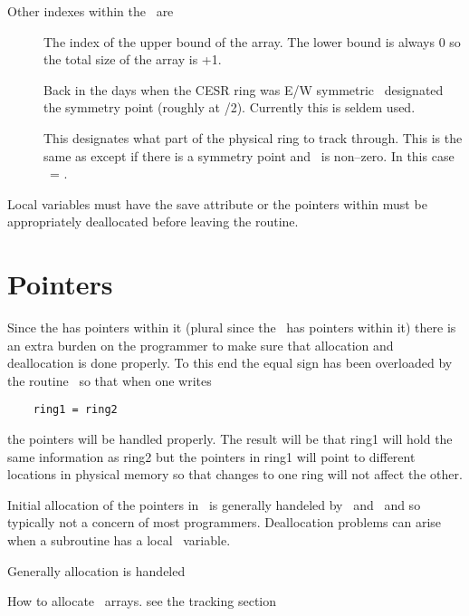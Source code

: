 Other indexes within the \ringstruct\ are
\begin{description}
\item[\nelemaxx] The index of the upper bound of the \ele{:} array.
The lower bound is always 0 so the total size of the \ele{:} array is
\nelemaxx+1.
\item[\nelesymm] Back in the days when the CESR ring was E/W 
symmetric \nelesymm\ designated the symmetry point (roughly at \nelering/2). 
Currently this is seldem used.
\item[\neleuse] This designates what part of the physical ring to track 
through. This is the same as \nelering except if there is a symmetry point and \nelesymm\ is non--zero. In this case \neleuse\ = \nelesymm.
\end{description}

Local \ringstruct variables must have the save attribute or the
pointers within must be appropriately deallocated before leaving the
routine.

\section{Pointers}

Since the \ringstruct has pointers within it (plural since the \elestruct\
has pointers within it) there is an extra burden on the programmer to
make sure that allocation and deallocation is done properly. To this
end the equal sign has been overloaded by the routine \ringequalring\
so that when one writes
\begin{verbatim}
    ring1 = ring2
\end{verbatim}
the pointers will be handled properly. The result will be that ring1
will hold the same information as ring2 but the pointers in ring1 will
point to different locations in physical memory so that changes to one
ring will not affect the other.

Initial allocation of the pointers in \ringstruct\ is generally
handeled by \bmadparser\ and \ringequalring\ and so typically not a
concern of most programmers. Deallocation problems can arise when a
subroutine has a local \ringstruct\ variable. 



Generally allocation is handeled

How to allocate \coordstruct\ arrays. see the tracking section
